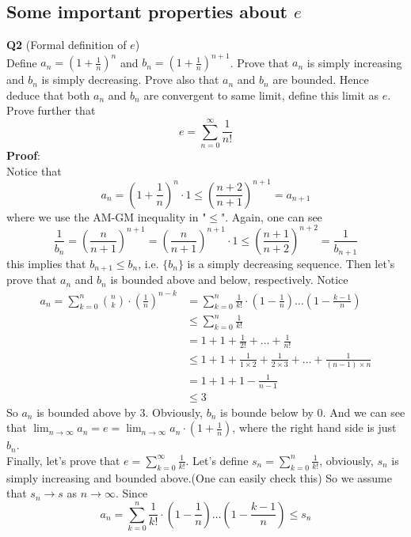 \documentclass{article}
\newcommand{\tb}[1]{\textbf{#1}}
\begin{document}
\subsection{Some important properties about $e$}
\tb{Q2} (Formal definition of $e$)\\
Define $a_n = \left ( 1+ \frac{1}{n}\right )^n$ and $b_n = \left ( 1+ \frac{1}{n}\right )^{n+1}$. Prove that $a_n$ is simply increasing and $b_n$ is simply decreasing. Prove also that $a_n$ and $b_n$ are bounded. 
Hence deduce that both $a_n$ and $b_n$ are convergent to same limit, define this limit as $e$. Prove further that 
$$
e = \sum_{n=0}^{\infty} \frac{1}{n!}
$$
\tb{Proof}:\\
Notice that 
$$
a_n = \left ( 1 + \frac{1}{n}\right )^{n} \cdot 1 \leq \left( \frac{n+2}{n+1}\right)^{n+1} = a_{n+1}
$$
where we use the AM-GM inequality in "$\leq$". Again, one can see 
$$
\frac{1}{b_n} = \left( \frac{n}{n+1}\right)^{n+1} = \left( \frac{n}{n+1}\right)^{n+1} \cdot 1 \leq \left( \frac{n+1}{n+2}\right) ^{n+2} = \frac{1}{b_{n+1}}
$$
this implies that $b_{n+1} \leq b_n$, i.e. $\{b_n\}$ is a simply decreasing sequence. Then let's prove that $a_n$ and $b_n$ is bounded above and below, respectively. 
Notice 
\begin{align*}
a_n = \sum_{k = 0}^{n} \binom{n}{k} \cdot \left( \frac{1}{n} \right)^{n-k} &= \sum_{k = 0}^{n} \frac{1}{k!} \cdot \left(1 - \frac{1}{n}\right) \dots \left(1 - \frac{k-1}{n}\right) \\
    &\leq \sum_{k = 0}^{n} \frac{1}{k!}\\
    &=1 + 1 + \frac{1}{2!} + \dots + \frac{1}{n!}\\
    &\leq 1 + 1 + \frac{1}{1\times 2} + \frac{1}{2\times 3} +\dots + \frac{1}{(n-1)\times n}\\
    &= 1 + 1 + 1 - \frac{1}{n-1}\\
    &\leq 3
\end{align*}
So $a_n$ is bounded above by $3$. Obviously, $b_n$ is bounde below by $0$. And we can see that $\lim_{n \to \infty} a_n  = e = \lim_{n \to \infty} a_n \cdot \left(1+\frac{1}{n}\right)$, where the 
right hand side is just $b_n$.\\
Finally, let's prove that $e = \sum_{k=0}^{\infty} \frac{1}{k!}$. Let's define $s_n = \sum_{k=0}^{n} \frac{1}{k!}$, obviously, 
$s_n$ is simply increasing and bounded above.(One can easily check this) So we assume that $s_n \rightarrow s$ as $n \rightarrow \infty$. Since
$$
a_n = \sum_{k = 0}^{n} \frac{1}{k!} \cdot \left( 1 - \frac{1}{n}\right) \dots \left(1 - \frac{k-1}{n}\right) \leq s_n
$$
\end{document}
